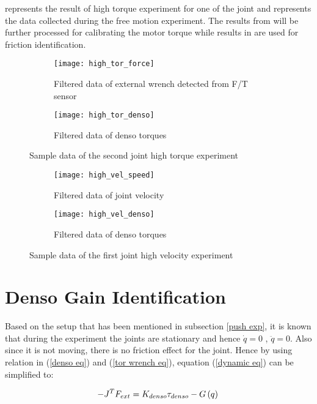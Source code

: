  represents the result of high torque experiment for one of the joint and  represents the data collected during the free motion experiment. The results from  will be further processed for calibrating the motor torque while results in  are used for friction identification.

\begin{figure}[H]
  \begin{subfigure}[t]{0.5\textwidth}
    \centering
    \texttt{[image: high\_tor\_force]} 
    \caption{Filtered data of external wrench detected from F/T sensor}
  \end{subfigure}
  \begin{subfigure}[t]{0.5\textwidth}
    \centering
    \texttt{[image: high\_tor\_denso]}
    \caption{Filtered data of denso torques}
  \end{subfigure}
  \caption{Sample data of the second joint high torque experiment}
  \label{fig: push result}
\end{figure}

\begin{figure}[H]
  \begin{subfigure}[t]{0.5\textwidth}
    \centering
    \texttt{[image: high\_vel\_speed]} 
    \caption{Filtered data of joint velocity}
  \end{subfigure}
  \begin{subfigure}[t]{0.5\textwidth}
    \centering
    \texttt{[image: high\_vel\_denso]}
    \caption{Filtered data of denso torques}
  \end{subfigure}
  \caption{Sample data of the first joint high velocity experiment}
  \label{fig: fric result}
\end{figure}


\section{Denso Gain Identification}
Based on the setup that has been mentioned in subsection \ref{push exp}, it is known that during the experiment the joints are stationary and hence $\dot{q} = 0$ , $\ddot{q} = 0$. Also since it is not moving, there is no friction effect for the joint. Hence by using relation in (\ref{denso eq}) and (\ref{tor wrench eq}), equation (\ref{dynamic eq}) can be simplified to:

\begin{equation}
  - J^{T} F_{ext} = K_{denso} \tau_{denso} - G\left(q \right)\\
\end{equation}

